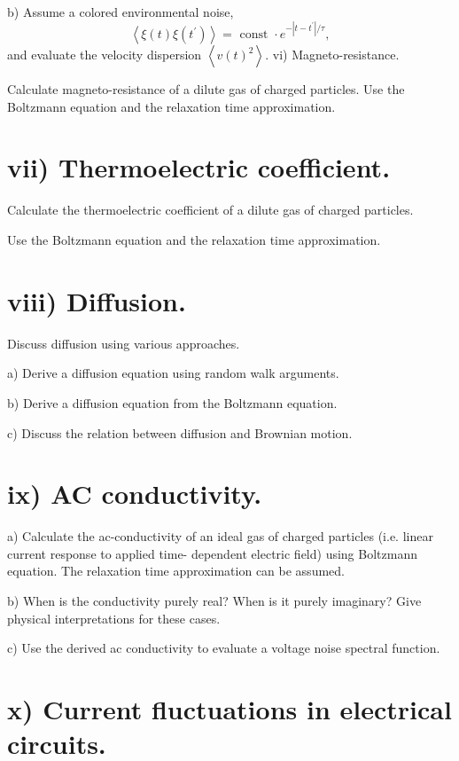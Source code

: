 \documentclass[UTF8]{ctexart}
\begin{document}
b) Assume a colored environmental noise,
$$
\left\langle\xi(t) \xi\left(t^{\prime}\right)\right\rangle=\text { const } \cdot e^{-\left|t-t^{\prime}\right| / \tau},
$$
and evaluate the velocity dispersion $\left\langle v(t)^{2}\right\rangle$. vi) Magneto-resistance.

Calculate magneto-resistance of a dilute gas of charged particles. Use the Boltzmann equation and the relaxation time approximation.

\section{vii) Thermoelectric coefficient.}

Calculate the thermoelectric coefficient of a dilute gas of charged particles.

Use the Boltzmann equation and the relaxation time approximation.

\section{viii) Diffusion.}

Discuss diffusion using various approaches.

a) Derive a diffusion equation using random walk arguments.

b) Derive a diffusion equation from the Boltzmann equation.

c) Discuss the relation between diffusion and Brownian motion.

\section{ix) AC conductivity.}

a) Calculate the ac-conductivity of an ideal gas of charged particles (i.e. linear current response to applied time- dependent electric field) using Boltzmann equation. The relaxation time approximation can be assumed.

b) When is the conductivity purely real? When is it purely imaginary? Give physical interpretations for these cases.

c) Use the derived ac conductivity to evaluate a voltage noise spectral function.

\section{x) Current fluctuations in electrical circuits.}
\end{document}
